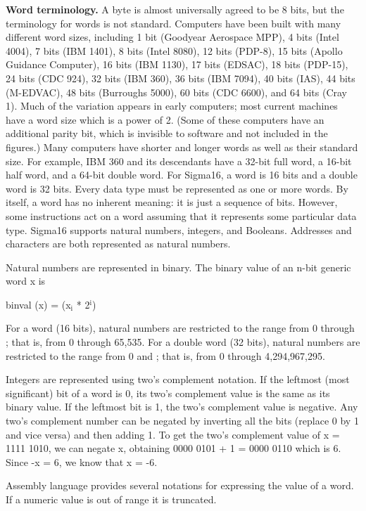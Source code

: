 \documentclass[11pt]{article}
\begin{document}
\textbf{Word terminology.} A byte is almost universally agreed to be 8 bits,
but the terminology for words is not standard.  Computers have been
built with many different word sizes, including 1 bit (Goodyear
Aerospace MPP), 4 bits (Intel 4004), 7 bits (IBM 1401), 8 bits (Intel
8080), 12 bits (PDP-8), 15 bits (Apollo Guidance Computer), 16 bits
(IBM 1130), 17 bits (EDSAC), 18 bits (PDP-15), 24 bits (CDC 924), 32
bits (IBM 360), 36 bits (IBM 7094), 40 bits (IAS), 44 bits (M-EDVAC),
48 bits (Burroughs 5000), 60 bits (CDC 6600), and 64 bits (Cray 1).
Much of the variation appears in early computers; most current
machines have a word size which is a power of 2.  (Some of these
computers have an additional parity bit, which is invisible to
software and not included in the figures.)
Many computers have shorter and longer words as well as their standard
size.  For example, IBM 360 and its descendants have a 32-bit full
word, a 16-bit half word, and a 64-bit double word.  For Sigma16, a
word is 16 bits and a double word is 32 bits.
Every data type must be represented as one or more words.  By itself,
a word has no inherent meaning: it is just a sequence of bits.
However, some instructions act on a word assuming that it represents
some particular data type.  Sigma16 supports natural numbers,
integers, and Booleans.  Addresses and characters are both represented
as natural numbers.

Natural numbers are represented in binary.  The binary value of an
n-bit generic word x is

binval (x) =  (x\(_{\text{i}}\) * 2\(^{\text{i}}\))

For a word (16 bits), natural numbers are restricted to the range from
0 through ; that is, from 0 through
65,535.  For a double word (32 bits), natural numbers are restricted
to the range from 0 and ; that is, from 0
through 4,294,967,295.

Integers are represented using two's complement notation.  If the
leftmost (most significant) bit of a word is 0, its two's complement
value is the same as its binary value.  If the leftmost bit is 1, the
two's complement value is negative.  Any two's complement number can
be negated by inverting all the bits (replace 0 by 1 and vice versa)
and then adding 1.  To get the two's complement value of x = 1111
1010, we can negate x, obtaining 0000 0101 + 1 = 0000 0110 which is 6.
Since -x = 6, we know that x = -6.

Assembly language provides several notations for expressing the value
of a word.  If a numeric value is out of range it is truncated.
\end{document}
